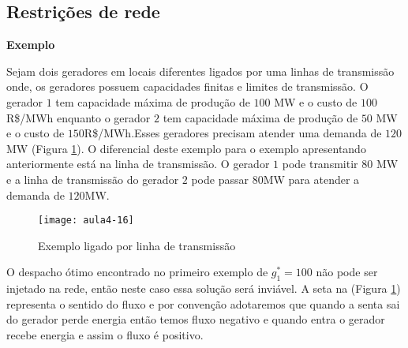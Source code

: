 \subsection{Restrições de rede}
\textbf{Exemplo}

Sejam dois geradores em locais diferentes ligados por uma linhas de transmissão onde, os geradores possuem capacidades finitas e limites de transmissão. O gerador $1$ tem capacidade máxima de produção de $100$ MW e o custo de $100$R\$/MWh enquanto o  gerador $2$  tem capacidade máxima de produção de $50$ MW e o custo de $150$R\$/MWh.Esses geradores precisam atender uma demanda de $120$MW (Figura \ref{fig:aula4-16}). O diferencial deste exemplo para o exemplo apresentando anteriormente está na linha de transmissão. O gerador $1$ pode transmitir $80$ MW e a linha de transmissão do gerador $2$ pode passar $80$MW para atender a demanda de $120$MW.
\begin{figure}[H]
\begin{centering}
\texttt{[image: aula4-16]}\protect\caption{\label{fig:aula4-16} Exemplo ligado por linha de transmissão}
\end{centering}
\end{figure}
O despacho ótimo encontrado no primeiro exemplo de $g_{1}^{*}=100$ não pode ser injetado na rede, então neste caso essa solução será inviável.
A seta na (Figura \ref{fig:aula4-16}) representa o sentido do fluxo e por convenção adotaremos que quando a senta sai do gerador perde energia então temos fluxo negativo e quando entra o gerador recebe energia e assim o fluxo é positivo.

